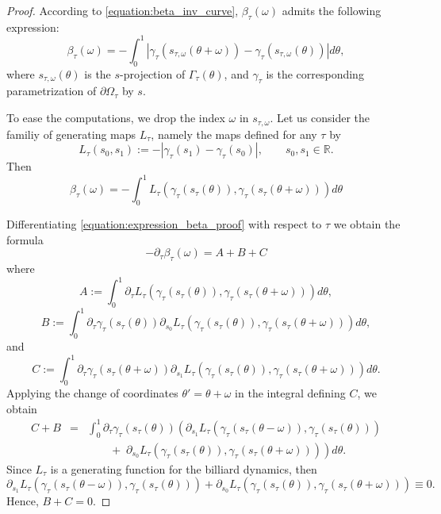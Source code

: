 \documentclass[12pt, openany]{amsart}
\theoremstyle{definition}
\theoremstyle{remark}
\theoremstyle{remark}
\theoremstyle{theorem}
\theoremstyle{theorem}
\theoremstyle{theorem}
\theoremstyle{theorem}
\newcommand{\RR}{\mathbb{R}}
\begin{document}
\begin{proof}%
According to \eqref{equation:beta_inv_curve}, $\beta_{\tau}(\omega)$ admits the following expression:
\[
\beta_{\tau}(\omega) = -\int_0^1|\gamma_{\tau}(s_{\tau,\omega}(\theta+\omega))-\gamma_{\tau}(s_{\tau,\omega}(\theta))|d\theta,
\]
where $s_{\tau,\omega}(\theta)$ is the $s$-projection of $\Gamma_{\tau}(\theta)$, and $\gamma_{\tau}$ is the corresponding parametrization of $\partial\Omega_{\tau}$ by $s$.

To ease the computations, we drop the index $\omega$ in $s_{\tau,\omega}$. Let us consider the familiy of generating maps $L_{\tau}$, namely the maps defined for any $\tau$ by
\[
L_{\tau}(s_0,s_1) := -|\gamma_{\tau}(s_1)-\gamma_{\tau}(s_0)|,\qquad s_0,s_1\in\RR.
\]
Then
\begin{equation}
\label{equation:expression_beta_proof}
\beta_{\tau}(\omega) = -\int_0^{1}L_{\tau}(\gamma_{\tau}(s_{\tau}(\theta)),\gamma_{\tau}(s_{\tau}(\theta+\omega)))d\theta
\end{equation}

Differentiating \eqref{equation:expression_beta_proof} with respect to $\tau$ we obtain the formula
\[
-\partial_{\tau}\beta_{\tau}(\omega) = A+B+C
\]
where
\[
A := \int_0^{1} \partial_{\tau} L_{\tau}(\gamma_{\tau}(s_{\tau}(\theta)),\gamma_{\tau}(s_{\tau}(\theta+\omega)))d\theta,
\]
\[
B := \int_0^{1}
\partial_{\tau}\gamma_{\tau}(s_{\tau}(\theta)) \partial_{s_0}L_{\tau}(\gamma_{\tau}(s_{\tau}(\theta)),\gamma_{\tau}(s_{\tau}(\theta+\omega)))d\theta,
\]
and 
\[
C := \int_0^{1}
\partial_{\tau}\gamma_{\tau}(s_{\tau}(\theta+\omega)) \partial_{s_1}L_{\tau}(\gamma_{\tau}(s_{\tau}(\theta)),\gamma_{\tau}(s_{\tau}(\theta+\omega)))d\theta.
\]
Applying the change of coordinates $\theta'=\theta+\omega$ in the integral defining $C$, we obtain
\begin{eqnarray*}
C+B &=& \int_0^{1}
\partial_{\tau}\gamma_{\tau}(s_{\tau}(\theta))
\left( 
\partial_{s_1}L_{\tau}(\gamma_{\tau}(s_{\tau}(\theta-\omega)),\gamma_{\tau}(s_{\tau}(\theta)))\right. \\
&& \left. \qquad + \;
\partial_{s_0}L_{\tau}(\gamma_{\tau}(s_{\tau}(\theta)),\gamma_{\tau}(s_{\tau}(\theta+\omega)))
\right)
d\theta. 
\end{eqnarray*}
Since $L_\tau$ is a generating function for the billiard dynamics, then
\[
\partial_{s_1}L_{\tau}(\gamma_{\tau}(s_{\tau}(\theta-\omega)),\gamma_{\tau}(s_{\tau}(\theta)))
+
\partial_{s_0}L_{\tau}(\gamma_{\tau}(s_{\tau}(\theta)),\gamma_{\tau}(s_{\tau}(\theta+\omega))) \equiv 0.
\]
Hence, $B+C=0$. 


\end{proof}
\end{document}
